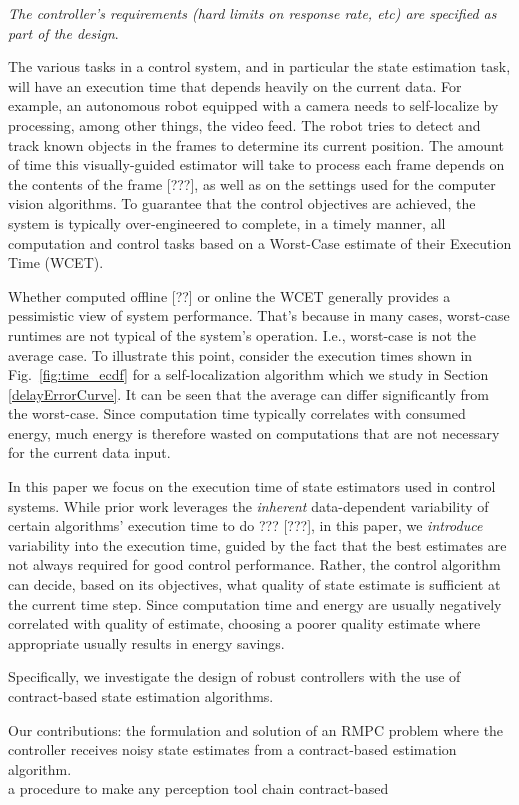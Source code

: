 

\emph{The controller's requirements (hard limits on response rate, etc) are specified as part of the design}.

The various tasks in a control system, and in particular the state estimation task, will have an execution time that depends heavily on the current data.
For example, an autonomous robot equipped with a camera needs to self-localize by processing, among other things, the video feed.
The robot tries to detect and track known objects in the frames to determine its current position.
The amount of time this visually-guided estimator will take to process each frame depends on the contents of the frame [???], as well as on the settings used for the computer vision algorithms.
To guarantee that the control objectives are achieved, the system is typically over-engineered to complete, in a timely manner, all computation and control tasks based on a Worst-Case estimate of their Execution Time (WCET).

Whether computed offline [??] or online \cite{hendsethB12_OnlineWCET} the WCET generally provides a pessimistic view of system performance.
That's because in many cases, worst-case runtimes are not typical of the system's operation.
I.e., worst-case is not the average case.
To illustrate this point, consider the execution times shown in Fig.~\ref{fig:time_ecdf} for a self-localization algorithm which we study in Section \ref{delayErrorCurve}.
It can be seen that the average can differ significantly from the worst-case.
Since computation time typically correlates with consumed energy, much energy is therefore wasted on computations that are not necessary for the current data input.

In this paper we focus on the execution time of state estimators used in control systems.
While prior work leverages the \emph{inherent} data-dependent variability of certain algorithms' execution time to do ??? [???], in this paper, we \emph{introduce} variability into the execution time, guided by the fact that the best estimates are not always required for good control performance.
Rather, the control algorithm can decide, based on its objectives, what quality of state estimate is sufficient at the current time step.
Since computation time and energy are usually negatively correlated with quality of estimate, choosing a poorer quality estimate where appropriate usually results in energy savings.

Specifically, we investigate the design of robust controllers with the use of contract-based state estimation algorithms.

Our contributions:
the formulation and solution of an RMPC problem where the controller receives noisy state estimates from a contract-based estimation algorithm.
\\
a procedure to make any perception tool chain contract-based


